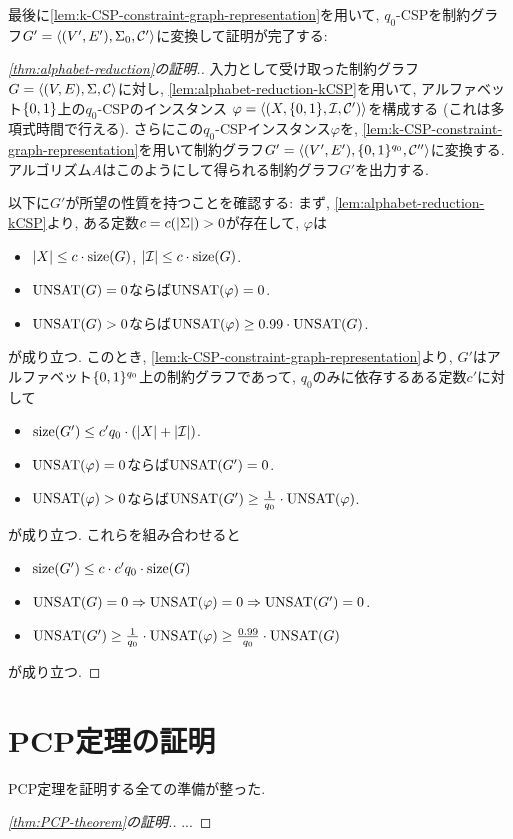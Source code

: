 最後に\cref{lem:k-CSP-constraint-graph-representation}を用いて, $q_0$-CSPを制約グラフ$G'=\langle(V',E'),\Sigma_0,\mathcal{C}'\rangle$に変換して証明が完了する:
\begin{proof}[\cref{thm:alphabet-reduction}の証明.]
  入力として受け取った制約グラフ$G=\langle(V,E),\Sigma,\mathcal{C}\rangle$に対し, \cref{lem:alphabet-reduction-kCSP}を用いて, アルファベット$\{0,1\}$上の$q_0$-CSPのインスタンス $\varphi=\langle(X,\{0,1\},\mathcal{I},\mathcal{C}')\rangle$を構成する (これは多項式時間で行える).
  さらにこの$q_0$-CSPインスタンス$\varphi$を, \cref{lem:k-CSP-constraint-graph-representation}を用いて制約グラフ$G'=\langle(V',E'),\{0,1\}^{q_0},\mathcal{C}''\rangle$に変換する.
  アルゴリズム$A$はこのようにして得られる制約グラフ$G'$を出力する.

  以下に$G'$が所望の性質を持つことを確認する:
  まず, \cref{lem:alphabet-reduction-kCSP}より, ある定数$c=c(\abs{\Sigma})>0$が存在して, $\varphi$は
  \begin{itemize}
    \item $\abs{X} \le c\cdot\mathrm{size}(G)$, $\abs{\mathcal{I}} \le c\cdot\mathrm{size}(G)$.
    \item $\mathrm{UNSAT}(G)=0$ならば$\mathrm{UNSAT}(\varphi)=0$.
    \item $\mathrm{UNSAT}(G)>0$ならば$\mathrm{UNSAT}(\varphi) \ge 0.99\cdot\mathrm{UNSAT}(G)$.
  \end{itemize}
  が成り立つ.
  このとき, \cref{lem:k-CSP-constraint-graph-representation}より, $G'$はアルファベット$\{0,1\}^{q_0}$上の制約グラフであって, $q_0$のみに依存するある定数$c'$に対して
  \begin{itemize}
    \item $\mathrm{size}(G') \le c'q_0\cdot (\abs{X} + \abs{\mathcal{I}})$.
    \item $\mathrm{UNSAT}(\varphi)=0$ならば$\mathrm{UNSAT}(G')=0$.
    \item $\mathrm{UNSAT}(\varphi)>0$ならば$\mathrm{UNSAT}(G') \ge \frac{1}{q_0}\cdot\mathrm{UNSAT}(\varphi)$.
  \end{itemize}
  が成り立つ.
  これらを組み合わせると
  \begin{itemize}
    \item $\mathrm{size}(G') \le c\cdot c'q_0\cdot\mathrm{size}(G)$
    \item $\mathrm{UNSAT}(G)=0 \Rightarrow \mathrm{UNSAT}(\varphi)=0\Rightarrow \mathrm{UNSAT}(G')=0$.
    \item $\mathrm{UNSAT}(G') \ge \frac{1}{q_0}\cdot \mathrm{UNSAT}(\varphi) \ge \frac{0.99}{q_0}\cdot \mathrm{UNSAT}(G)$
  \end{itemize}
  が成り立つ.
\end{proof}

\section{PCP定理の証明}
PCP定理を証明する全ての準備が整った.
\begin{proof}[\cref{thm:PCP-theorem}の証明.]
  ...
\end{proof}